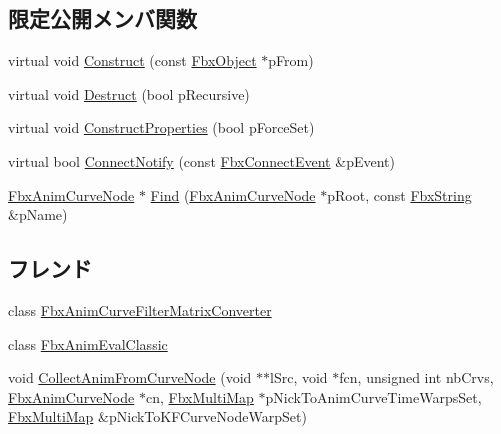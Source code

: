 \subsection*{限定公開メンバ関数}
\begin{DoxyCompactItemize}
\item 
virtual void \hyperlink{class_fbx_anim_curve_node_a68463f3262085ccffef1d5a68fbd4823}{Construct} (const \hyperlink{class_fbx_object}{Fbx\+Object} $\ast$p\+From)
\item 
virtual void \hyperlink{class_fbx_anim_curve_node_aa5702533aa63185ec4549b73915476d7}{Destruct} (bool p\+Recursive)
\item 
virtual void \hyperlink{class_fbx_anim_curve_node_a979eca26d04013f0ef958173d34aef15}{Construct\+Properties} (bool p\+Force\+Set)
\item 
virtual bool \hyperlink{class_fbx_anim_curve_node_a0a3743b600796ab2b87dea299654b98c}{Connect\+Notify} (const \hyperlink{class_fbx_connect_event}{Fbx\+Connect\+Event} \&p\+Event)
\item 
\hyperlink{class_fbx_anim_curve_node}{Fbx\+Anim\+Curve\+Node} $\ast$ \hyperlink{class_fbx_anim_curve_node_aa60f953e94636bb23a94860f60cc63e1}{Find} (\hyperlink{class_fbx_anim_curve_node}{Fbx\+Anim\+Curve\+Node} $\ast$p\+Root, const \hyperlink{class_fbx_string}{Fbx\+String} \&p\+Name)
\end{DoxyCompactItemize}
\subsection*{フレンド}
\begin{DoxyCompactItemize}
\item 
class \hyperlink{class_fbx_anim_curve_node_a0e66be27522fe93db7ee48dbdb4420bb}{Fbx\+Anim\+Curve\+Filter\+Matrix\+Converter}
\item 
class \hyperlink{class_fbx_anim_curve_node_a1b769b6684b71dfe76f350fef1137cab}{Fbx\+Anim\+Eval\+Classic}
\item 
void \hyperlink{class_fbx_anim_curve_node_a54d20e7508453ca014d08b85da892621}{Collect\+Anim\+From\+Curve\+Node} (void $\ast$$\ast$l\+Src, void $\ast$fcn, unsigned int nb\+Crvs, \hyperlink{class_fbx_anim_curve_node}{Fbx\+Anim\+Curve\+Node} $\ast$cn, \hyperlink{class_fbx_multi_map}{Fbx\+Multi\+Map} $\ast$p\+Nick\+To\+Anim\+Curve\+Time\+Warps\+Set, \hyperlink{class_fbx_multi_map}{Fbx\+Multi\+Map} \&p\+Nick\+To\+K\+F\+Curve\+Node\+Warp\+Set)
\end{DoxyCompactItemize}
